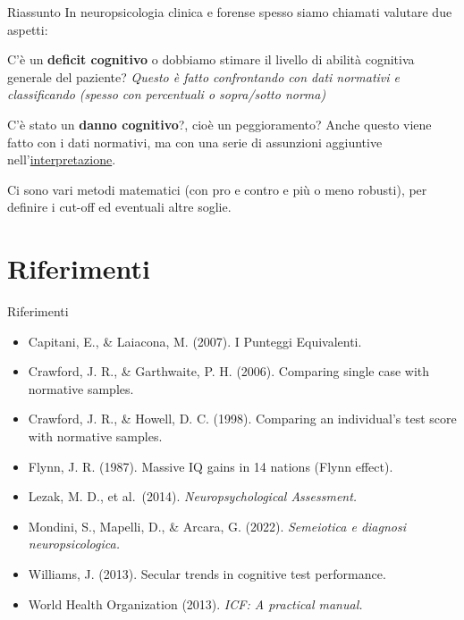\documentclass[
  ignorenonframetext,
  aspectratio=169,
]{beamer}
\providecommand{\tightlist}{%
  \setlength{\itemsep}{0pt}\setlength{\parskip}{0pt}}
\begin{document}
\begin{frame}{Riassunto}
\label{riassunto}
In neuropsicologia clinica e forense spesso siamo chiamati valutare due
aspetti:

C'è un \textbf{deficit cognitivo} o dobbiamo stimare il livello di
abilità cognitiva generale del paziente? \emph{Questo è fatto
confrontando con dati normativi e classificando (spesso con percentuali
o sopra/sotto norma)}

C'è stato un \textbf{danno cognitivo}?, cioè un peggioramento? Anche
questo viene fatto con i dati normativi, ma con una serie di assunzioni
aggiuntive nell'\underline{interpretazione}.

Ci sono vari metodi matematici (con pro e contro e più o meno robusti),
per definire i cut-off ed eventuali altre soglie.
\end{frame}

\section{Riferimenti}\label{riferimenti}

\begin{frame}{Riferimenti}
\label{riferimenti-1}
\footnotesize

\begin{itemize}
\tightlist
\item
  Capitani, E., \& Laiacona, M. (2007). I Punteggi Equivalenti.
\item
  Crawford, J. R., \& Garthwaite, P. H. (2006). Comparing single case
  with normative samples.
\item
  Crawford, J. R., \& Howell, D. C. (1998). Comparing an individual's
  test score with normative samples.
\item
  Flynn, J. R. (1987). Massive IQ gains in 14 nations (Flynn effect).
\item
  Lezak, M. D., et al.~(2014). \emph{Neuropsychological Assessment.}
\item
  Mondini, S., Mapelli, D., \& Arcara, G. (2022). \emph{Semeiotica e
  diagnosi neuropsicologica.}
\item
  Williams, J. (2013). Secular trends in cognitive test performance.
\item
  World Health Organization (2013). \emph{ICF: A practical manual.}
\end{itemize}
\end{frame}
\end{document}
